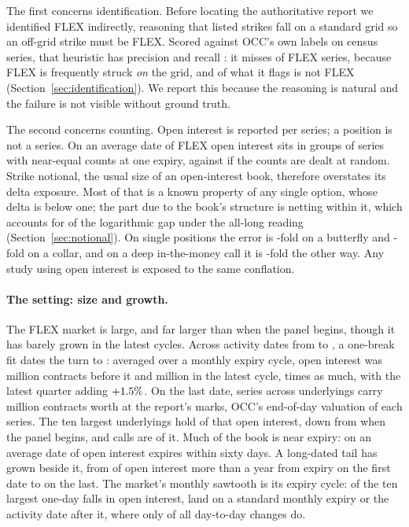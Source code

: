 \documentclass[11pt]{article}
\begin{document}
The first concerns identification. Before locating the authoritative report we
identified FLEX indirectly, reasoning that listed strikes fall on a standard grid so an
off-grid strike must be FLEX. Scored against OCC's own labels on \CensusSeries{} census
series, that heuristic has precision \RulePrecision{} and recall \RuleRecall{}: it misses
\FlexOnGridShare{} of FLEX series, because FLEX is frequently struck \emph{on} the grid,
and \RuleFalseShare{} of what it flags is not FLEX (Section~\ref{sec:identification}).
We report this because the reasoning is natural and the failure is not visible without
ground truth.

The second concerns counting. Open interest is reported per series; a position is not a
series. On an average date \PosStructuredMean{} of FLEX open interest sits in groups of series
with near-equal counts at one expiry, against \PosChance{} if the counts are dealt at random.
Strike notional, the usual size of an open-interest book, therefore overstates its delta
exposure. Most of that is a known property of any single option, whose delta is below
one; the part due to the book's structure is netting within it, which accounts for
\PosNettingShare{} of the logarithmic gap under the all-long reading
(Section~\ref{sec:notional}). On single positions the error is \PosButterflyTimes{}-fold on
a butterfly and \PosCollarTimes{}-fold on a collar, and on a deep in-the-money call it is
\PosDeepTimes{}-fold the other way. Any study using open interest is exposed to the same
conflation.

\paragraph{The setting: size and growth.} The FLEX market is large, and far larger than when the panel
begins, though it has barely grown in the latest cycles. Across \PanelDates{} activity
dates from \PanelStart{} to \PanelEnd{}, a one-break fit dates the turn to
\BreakMonth{}: averaged over a monthly expiry cycle, open interest was \OIFlatLevel{}
million contracts before it and \OICycleLatest{} million in the latest cycle,
\GrowthMultiple{} times as much, with the latest quarter adding $+1.5\%$. On
the last date, \SeriesEnd{} series across \UnderlyingsEnd{}
underlyings carry \OIEnd{} million contracts worth \ValueEnd{} at the report's marks,
OCC's end-of-day valuation of each series.
The ten largest underlyings hold \TopTenShare{} of that open interest, down from
\TopTenShareStart{} when the panel begins, and calls are \CallShare{} of it. Much of
the book is near expiry: on an average date \WithinSixtyMean{} of open interest expires
within sixty days. A long-dated tail has grown beside it, from \OverOneYearStart{} of
open interest more than a year from expiry on the first date to \OverOneYear{} on the
last. The market's monthly sawtooth is its expiry cycle: of the ten largest one-day
falls in open interest, \DropsOnExpiry{} land on a standard monthly expiry or the
activity date after it, where only \ExpiryWindowShare{} of all day-to-day changes do.
\end{document}
